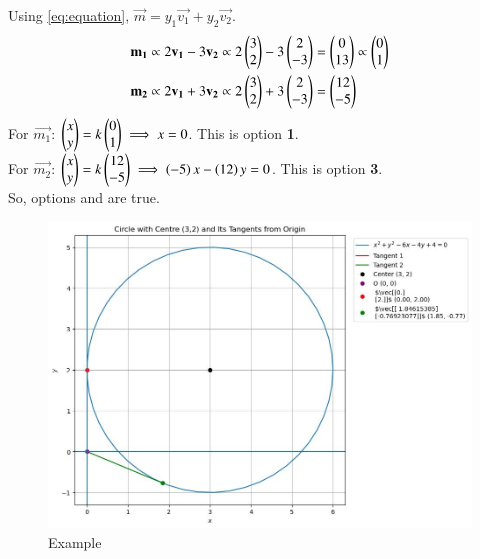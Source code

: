 \documentclass[journal]{IEEEtran}
\begin{document}
Using \eqref{eq:equation}, $\vec{m} = y_1\vec{v_1}+y_2\vec{v_2}$.
\begin{align}
    \mathbf{m_1} &\propto 2\mathbf{v_1} - 3\mathbf{v_2} \propto 2\begin{pmatrix}3 \\ 2\end{pmatrix} - 3\begin{pmatrix}2 \\ -3\end{pmatrix} = \begin{pmatrix}0 \\ 13\end{pmatrix} \propto \begin{pmatrix}0 \\ 1\end{pmatrix} \\
    \mathbf{m_2} &\propto 2\mathbf{v_1} + 3\mathbf{v_2} \propto 2\begin{pmatrix}3 \\ 2\end{pmatrix} + 3\begin{pmatrix}2 \\ -3\end{pmatrix} = \begin{pmatrix}12 \\ -5\end{pmatrix}
\end{align}
For $\vec{m_1}$: $\begin{pmatrix}x \\ y\end{pmatrix} = k\begin{pmatrix}0 \\ 1\end{pmatrix} \implies x = 0$. This is option \textbf{1}. \\
For $\vec{m_2}$: $\begin{pmatrix}x \\ y\end{pmatrix} = k\begin{pmatrix}12 \\ -5\end{pmatrix} \implies \left(-5\right)x - \left(12\right)y = 0$. This is option \textbf{3}. \\
So, options \textbf{} and \textbf{} are true.

\begin{figure}
	\centering
	\includegraphics[width=\columnwidth]{figs/plot_p.jpg}
	\caption*{Example}
	\label{fig:example}
\end{figure}
\end{document}
